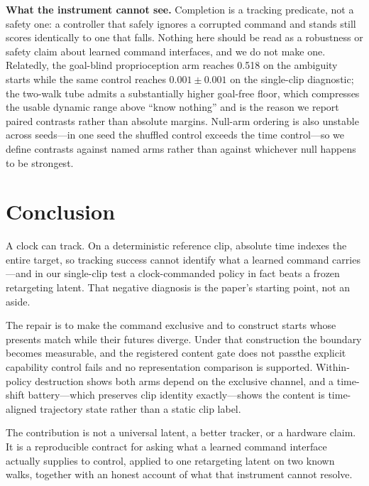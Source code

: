 \documentclass[conference]{IEEEtran}
\newif\ifeexplicitvalid
\newif\ifepositivecontent
\newcommand{\EProprioAmb}{0.518}
\begin{document}
\textbf{What the instrument cannot see.}  Completion is a tracking predicate, not a safety
one: a controller that safely ignores a corrupted command and stands still scores
identically to one that falls.  Nothing here should be read as a robustness or safety
claim about learned command interfaces, and we do not make one.  Relatedly, the
goal-blind proprioception arm reaches \EProprioAmb{} on the ambiguity starts while the
same control reaches $0.001\pm0.001$ on the single-clip diagnostic; the two-walk tube
admits a substantially higher goal-free floor, which compresses the usable dynamic range
above ``know nothing'' and is the reason we report paired contrasts rather than absolute
margins.  Null-arm ordering is also unstable across seeds---in one seed the shuffled
control exceeds the time control---so we define contrasts against named arms rather than
against whichever null happens to be strongest.

\section{Conclusion}
A clock can track.  On a deterministic reference clip, absolute time indexes the entire
target, so tracking success cannot identify what a learned command carries---and in our
single-clip test a clock-commanded policy in fact beats a frozen retargeting latent.  That
negative diagnosis is the paper's starting point, not an aside.

The repair is to make the command exclusive and to construct starts whose presents match
while their futures diverge.  Under that construction the boundary becomes measurable, and
\ifeexplicitvalid\ifepositivecontent the frozen latent shows a registered advantage over
both an equally trained clock and a phase-matched misaligned-reference control\else the
registered content gate does not pass\fi\else the explicit capability control fails and no
representation comparison is supported\fi.  Within-policy destruction shows both arms
depend on the exclusive channel, and a time-shift battery---which preserves clip identity
exactly---shows the content is time-aligned trajectory state rather than a static clip
label.

The contribution is not a universal latent, a better tracker, or a hardware claim.  It is a
reproducible contract for asking what a learned command interface actually supplies to
control, applied to one retargeting latent on two known walks, together with an honest
account of what that instrument cannot resolve.
\end{document}
